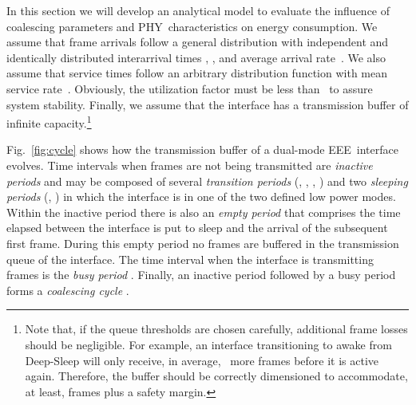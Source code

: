 \documentclass[journal,10pt,letterpaper]{IEEEtran}
\begin{document}
In this section we will develop an analytical model to evaluate the
influence of coalescing parameters and PHY~characteristics on energy
consumption. We assume that frame arrivals follow a general
distribution with independent and identically distributed interarrival
times , , and average arrival rate~. We
also assume that service times follow an arbitrary distribution
function with mean service rate~. Obviously, the utilization
factor  must be less than~ to assure system
stability. Finally, we assume that the interface has a transmission
buffer of infinite capacity.\footnote{Note that, if the queue
  thresholds are chosen carefully, additional frame losses should be
  negligible. For example, an interface transitioning to awake from
  Deep-Sleep will only receive, in average, ~more frames before it is active again. Therefore,
  the buffer should be correctly dimensioned to accommodate, at least,
   frames plus a safety
  margin.}

Fig.~\ref{fig:cycle} shows how the transmission buffer of a dual-mode
EEE~interface evolves. Time intervals when frames are not being
transmitted are \emph{inactive periods} and may be composed of several
\emph{transition periods} (, ,
, ) and two \emph{sleeping
  periods} (, ) in which the interface
is in one of the two defined low power modes. Within the inactive
period there is also an \emph{empty period}  that
comprises the time elapsed between the interface is put to sleep and
the arrival of the subsequent first frame. During this empty period no
frames are buffered in the transmission queue of the interface. The
time interval when the interface is transmitting frames is the
\emph{busy period} . Finally, an inactive period
followed by a busy period forms a \emph{coalescing cycle}
. 
\end{document}
